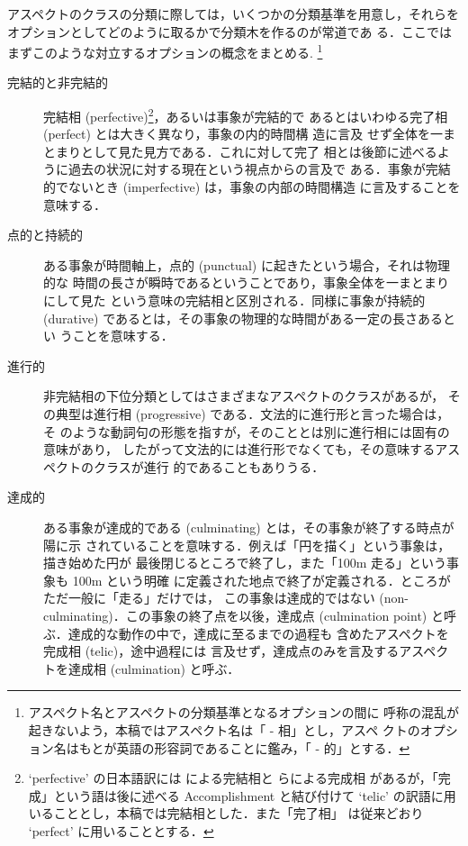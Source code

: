 アスペクトのクラスの分類に際しては，いくつかの分類基準を用意し，それらを
オプションとしてどのように取るかで分類木を作るのが常道であ
る．ここではまずこのような対立するオプションの概念をまとめる.
\footnote{アスペクト名とアスペクトの分類基準となるオプションの間に
呼称の混乱が起きないよう，本稿ではアスペクト名は「 - 相」とし，アスペ
クトのオプション名はもとが英語の形容詞であることに鑑み，「 - 的」とする．}
\begin{description}
\item [完結的と非完結的] 完結相 (perfective)\footnote{`perfective' 
の日本語訳には \cite{Machida89} による完結相と\cite{Kudou95} らによる完成相
があるが，「完成」という語は後に述べる Accomplishment と結び付けて 
`telic' の訳語に用いることとし，本稿では完結相とした．また「完了相」
は従来どおり `perfect' に用いることとする．}，あるいは事象が完結的で
あるとはいわゆる完了相 (perfect) とは大きく異なり，事象の内的時間構
造に言及 せず全体を一まとまりとして見た見方である．これに対して完了
相とは後節に述べるように過去の状況に対する現在という視点からの言及で
ある．事象が完結的でないとき (imperfective) は，事象の内部の時間構造
に言及することを意味する．

\item [点的と持続的]
ある事象が時間軸上，点的 (punctual) に起きたという場合，それは物理的な
時間の長さが瞬時であるということであり，事象全体を一まとまりにして見た
という意味の完結相と区別される．同様に事象が持続的 
(durative) であるとは，その事象の物理的な時間がある一定の長さあるとい
うことを意味する．

\item [進行的]
非完結相の下位分類としてはさまざまなアスペクトのクラスがあるが，
その典型は進行相 (progressive) である．文法的に進行形と言った場合は，そ
のような動詞句の形態を指すが，そのこととは別に進行相には固有の意味があり，
したがって文法的には進行形でなくても，その意味するアスペクトのクラスが進行
的であることもありうる．

\item [達成的]
ある事象が達成的である (culminating) とは，その事象が終了する時点が陽に示
されていることを意味する．例えば「円を描く」という事象は，描き始めた円が
最後閉じるところで終了し，また「100m 走る」という事象も 100m という明確
に定義された地点で終了が定義される．ところがただ一般に「走る」だけでは，
この事象は達成的ではない (non-culminating)．この事象の終了点を以後，達成点 
(culmination point) と呼ぶ．達成的な動作の中で，達成に至るまでの過程も
含めたアスペクトを完成相 (telic)，途中過程には
言及せず，達成点のみを言及するアスペクトを達成相 (culmination) と呼ぶ．

\end{description}

